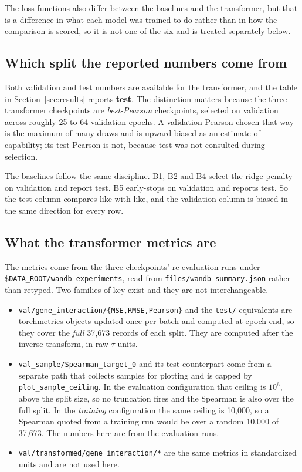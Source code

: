 The loss functions also differ between the baselines and the transformer, but
that is a difference in what each model was trained to do rather than in how the
comparison is scored, so it is not one of the six and is treated separately
below.

\subsection{Which split the reported numbers come from}

Both validation and test numbers are available for the transformer, and the
table in Section~\ref{sec:results} reports \textbf{test}. The distinction
matters because the three transformer checkpoints are \emph{best-Pearson}
checkpoints, selected on validation across roughly 25 to 64 validation epochs.
A validation Pearson chosen that way is the maximum of many draws and is
upward-biased as an estimate of capability; its test Pearson is not, because
test was not consulted during selection.

The baselines follow the same discipline. B1, B2 and B4 select the ridge
penalty on validation and report test. B5 early-stops on validation and reports
test. So the test column compares like with like, and the validation column is
biased in the same direction for every row.

\subsection{What the transformer metrics are}

The metrics come from the three checkpoints' re-evaluation runs under
\texttt{\$DATA\_ROOT/wandb-experiments}, read from
\texttt{files/wandb-summary.json} rather than retyped. Two families of key exist
and they are not interchangeable.

\begin{itemize}
\item \texttt{val/gene\_interaction/\{MSE,RMSE,Pearson\}} and the \texttt{test/}
  equivalents are torchmetrics objects updated once per batch and computed at
  epoch end, so they cover the \emph{full} 37{,}673 records of each split. They
  are computed after the inverse transform, in raw $\tau$ units.
\item \texttt{val\_sample/Spearman\_target\_0} and its test counterpart come
  from a separate path that collects samples for plotting and is capped by
  \texttt{plot\_sample\_ceiling}. In the evaluation configuration that ceiling
  is $10^{6}$, above the split size, so no truncation fires and the Spearman is
  also over the full split. In the \emph{training} configuration the same
  ceiling is 10{,}000, so a Spearman quoted from a training run would be over a
  random 10{,}000 of 37{,}673. The numbers here are from the evaluation runs.
\item \texttt{val/transformed/gene\_interaction/*} are the same metrics in
  standardized units and are not used here.
\end{itemize}

